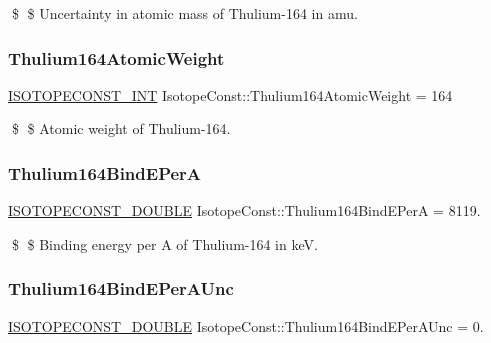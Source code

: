 \$ \$ Uncertainty in atomic mass of Thulium-\/164 in amu. \mbox{\label{group___isotope_const-_thulium-_tm164_ga711eb4af6c720547873442c7be921bfc}} 
\subsubsection{\texorpdfstring{Thulium164\+Atomic\+Weight}{Thulium164AtomicWeight}}
{\footnotesize\ttfamily \mbox{\hyperlink{group___isotope_const-_macros_ga5f18360b3e99483a35c32d789e62621c}{I\+S\+O\+T\+O\+P\+E\+C\+O\+N\+S\+T\+\_\+\+I\+NT}} Isotope\+Const\+::\+Thulium164\+Atomic\+Weight = 164}

\$ \$ Atomic weight of Thulium-\/164. \mbox{\label{group___isotope_const-_thulium-_tm164_ga96cc1e489add3899bd2b54fc8439c638}} 
\subsubsection{\texorpdfstring{Thulium164\+Bind\+E\+PerA}{Thulium164BindEPerA}}
{\footnotesize\ttfamily \mbox{\hyperlink{group___isotope_const-_macros_ga8f45a7272ce02c0b4c65c44636ed719a}{I\+S\+O\+T\+O\+P\+E\+C\+O\+N\+S\+T\+\_\+\+D\+O\+U\+B\+LE}} Isotope\+Const\+::\+Thulium164\+Bind\+E\+PerA = 8119.}

\$ \$ Binding energy per A of Thulium-\/164 in keV. \mbox{\label{group___isotope_const-_thulium-_tm164_ga43fdbffc3ed1de8cdac8e43575d8da56}} 
\subsubsection{\texorpdfstring{Thulium164\+Bind\+E\+Per\+A\+Unc}{Thulium164BindEPerAUnc}}
{\footnotesize\ttfamily \mbox{\hyperlink{group___isotope_const-_macros_ga8f45a7272ce02c0b4c65c44636ed719a}{I\+S\+O\+T\+O\+P\+E\+C\+O\+N\+S\+T\+\_\+\+D\+O\+U\+B\+LE}} Isotope\+Const\+::\+Thulium164\+Bind\+E\+Per\+A\+Unc = 0.}

